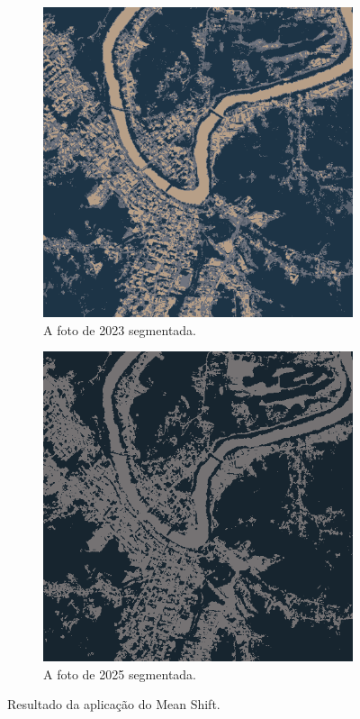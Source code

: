 \documentclass{article}
\begin{document}
\begin{figure}[H]
    \centering
    \begin{subfigure}[b]{0.48\textwidth}
        \includegraphics[width=\textwidth]{../Imagens/012023_mean_shift.png}
        \caption{A foto de 2023 segmentada.}
        \label{2023}
    \end{subfigure}
    \hfill %
    \begin{subfigure}[b]{0.48\textwidth}
        \includegraphics[width=\textwidth]{../Imagens/012025_mean_shift.png}
        \caption{A foto de 2025 segmentada.}
        \label{2025}
    \end{subfigure}
    \caption{Resultado da aplicação do Mean Shift.}
    \label{segmentada}
\end{figure}
\end{document}

